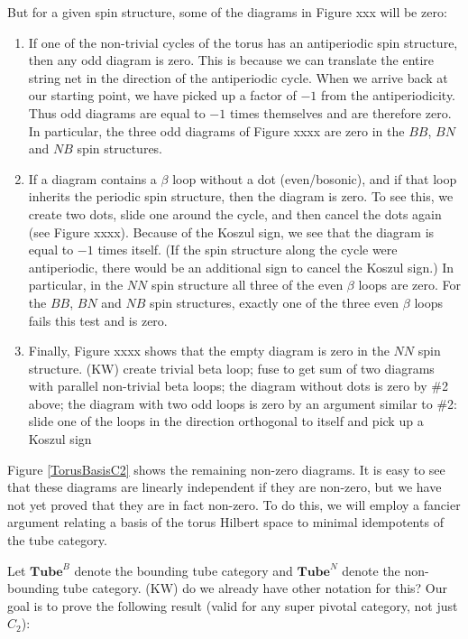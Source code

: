 \documentclass[12pt,a4paper]{article}
\newcommand{\tube}{\textbf{Tube}}
\newcommand{\kw}[1]{{\color{kwcolor}\footnotesize{(KW) #1}}}
\begin{document}
But for a given spin structure, some of the diagrams in Figure xxx will be zero:
\begin{enumerate}
	\item If one of the non-trivial cycles of the torus has an antiperiodic spin structure, then any odd diagram is zero.
	This is because we can translate the entire string net in the direction of the antiperiodic cycle.
	When we arrive back at our starting point, we have picked up a factor of $-1$ from the antiperiodicity.
	Thus odd diagrams are equal to $-1$ times themselves and are therefore zero.
	In particular, the three odd diagrams of Figure xxxx are zero in the $BB$, $BN$ and $NB$ spin structures.
	\item If a diagram contains a $\beta$ loop without a dot (even/bosonic), and if that loop inherits the periodic spin structure,
	then the diagram is zero.
	To see this, we create two dots, slide one around the cycle, and then cancel the dots again (see Figure xxxx).
	Because of the Koszul sign, we see that the diagram is equal to $-1$ times itself.
	(If the spin structure along the cycle were antiperiodic, there would be an additional sign to cancel the Koszul sign.)
	In particular, in the $NN$ spin structure all three of the even $\beta$ loops are zero.
	For the $BB$, $BN$ and $NB$ spin structures, exactly one of the three even $\beta$ loops fails this test and is zero.
	\item Finally, Figure xxxx shows that the empty diagram is zero in the $NN$ spin structure.
	\kw{create trivial beta loop; fuse to get sum of two diagrams with parallel non-trivial beta loops; the diagram without dots
	is zero by \#2 above; the diagram with two odd loops is zero by an argument similar to \#2: slide one of the loops in the direction
	orthogonal to itself and pick up a Koszul sign}
\end{enumerate}

Figure \ref{TorusBasisC2} shows the remaining non-zero diagrams.
It is easy to see that these diagrams are linearly independent if they are non-zero, but we have not yet proved that they are in fact non-zero.
To do this, we will employ a fancier argument relating a basis of the torus Hilbert space to minimal idempotents of the tube category.

\medskip

Let $\tube^B$ denote the bounding tube category and $\tube^N$ denote the non-bounding tube category.
\kw{do we already have other notation for this?}
Our goal is to prove the following result (valid for any super pivotal category, not just $C_2$):
\end{document}
